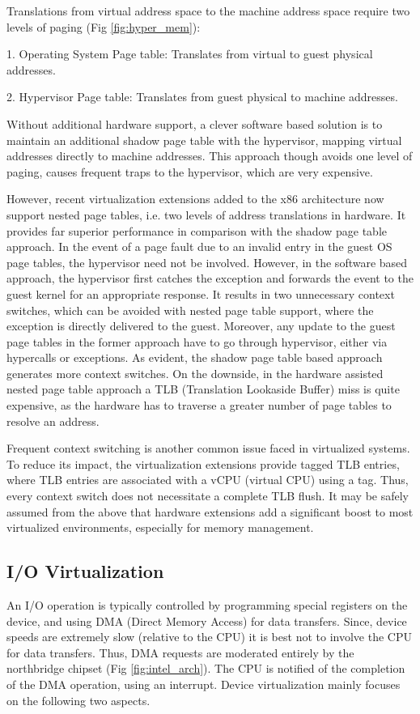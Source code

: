 Translations from virtual address space to the machine address space require two levels of paging (Fig \ref{fig:hyper_mem}):

1. Operating System Page table: Translates from virtual to guest physical addresses.

2. Hypervisor Page table: Translates from guest physical to machine addresses.

Without additional hardware support, a clever software based solution is to maintain an additional shadow page table with the hypervisor, mapping virtual addresses directly to machine addresses. This approach though avoids one level of paging, causes frequent traps to the hypervisor, which are very expensive.

However, recent virtualization extensions added to the x86 architecture now support nested page tables, i.e. two levels of address translations in hardware. It provides far superior performance in comparison with the shadow page table approach. In the event of a page fault due to an invalid entry in the guest OS page tables, the hypervisor need not be involved. However, in the software based approach, the hypervisor first catches the exception and forwards the event to the guest kernel for an appropriate response. It results in two unnecessary context switches, which can be avoided with nested page table support, where the exception is directly delivered to the guest. Moreover, any update to the guest page tables in the former approach have to go through hypervisor, either via hypercalls or exceptions. As evident, the shadow page table based approach generates more context switches. On the downside, in the hardware assisted nested page table approach a TLB (Translation Lookaside Buffer) miss is quite expensive, as the hardware has to traverse a greater number of page tables to resolve an address.

Frequent context switching is another common issue faced in virtualized systems. To reduce its impact, the virtualization extensions provide tagged TLB entries, where TLB entries are associated with a vCPU (virtual CPU) using a tag. Thus, every context switch does not necessitate a complete TLB flush. It may be safely assumed from the above that hardware extensions add a significant boost to most virtualized environments, especially for memory management.

\subsection{I/O Virtualization}
An I/O operation is typically controlled by programming special registers on the device, and using DMA (Direct Memory Access) for data transfers. Since, device speeds are extremely slow (relative to the CPU) it is best not to involve the CPU for data transfers. Thus, DMA requests are moderated entirely by the northbridge chipset (Fig \ref{fig:intel_arch}). The CPU is notified of the completion of the DMA operation, using an interrupt. Device virtualization mainly focuses on the following two aspects.


